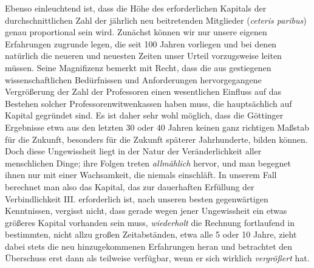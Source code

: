 Ebenso einleuchtend ist, dass die Höhe des erforderlichen Kapitals der durchschnittlichen Zahl der jährlich neu beitretenden Mitglieder (\textit{ceteris paribus}) genau proportional sein wird. Zunächst können wir nur unsere eigenen Erfahrungen zugrunde legen, die seit 100 Jahren vorliegen und bei denen natürlich die neueren und neuesten Zeiten unser Urteil vorzugsweise leiten müssen. Seine Magnifizenz bemerkt mit Recht, dass die aus gestiegenen wissenschaftlichen Bedürfnissen und Anforderungen hervorgegangene Vergrößerung der Zahl der Professoren einen wesentlichen Einfluss auf das Bestehen solcher Professorenwitwenkassen haben muss, die hauptsächlich auf Kapital gegründet sind. Es ist daher sehr wohl möglich, dass die Göttinger Ergebnisse etwa aus den letzten 30 oder 40 Jahren keinen ganz richtigen Maßstab für die Zukunft, besonders für die Zukunft späterer Jahrhunderte, bilden können. Doch diese Ungewissheit liegt in der Natur der Veränderlichkeit aller menschlichen Dinge; ihre Folgen treten \textit{allmählich} hervor, und man begegnet ihnen nur mit einer Wachsamkeit, die niemals einschläft. In unserem Fall berechnet man also das Kapital, das zur dauerhaften Erfüllung der Verbindlichkeit III. erforderlich ist, nach unseren besten gegenwärtigen Kenntnissen, vergisst nicht, dass gerade wegen jener Ungewissheit ein etwas größeres Kapital vorhanden sein muss, \textit{wiederholt} die Rechnung fortlaufend in bestimmten, nicht allzu großen
Zeitabständen, etwa alle 5 oder 10 Jahre, zieht dabei stets die neu hinzugekommenen Erfahrungen heran und betrachtet den Überschuss erst dann als teilweise verfügbar, wenn er sich wirklich \textit{vergrößert} hat.

